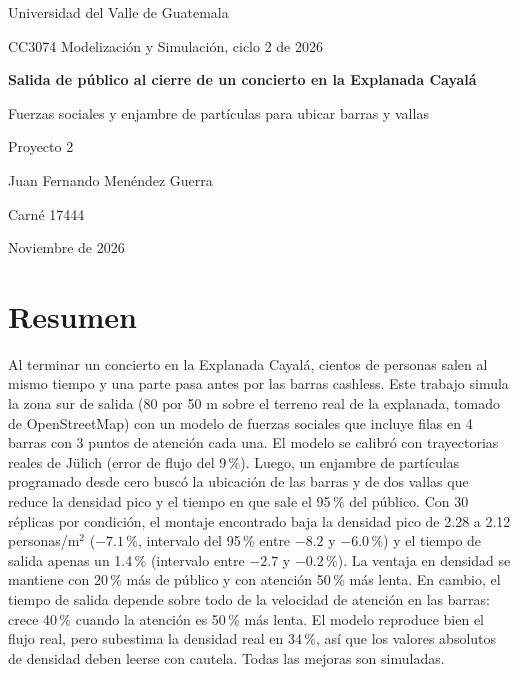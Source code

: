 \documentclass[11pt,letterpaper]{article}
\newcommand{\autor}{Juan Fernando Men\'endez Guerra}
\newcommand{\carne}{Carn\'e 17444}
\begin{document}
\begin{titlepage}
\centering
{\large Universidad del Valle de Guatemala\par}
{\large CC3074 Modelizaci\'on y Simulaci\'on, ciclo 2 de 2026\par}
\vspace{3cm}
{\LARGE\bfseries Salida de p\'ublico al cierre de un concierto en la Explanada Cayal\'a\par}
\vspace{0.5cm}
{\large Fuerzas sociales y enjambre de part\'iculas para ubicar barras y vallas\par}
\vspace{3cm}
{\large Proyecto 2\par}
\vspace{1cm}
{\large \autor\par \carne\par}
\vfill
{\large Noviembre de 2026\par}
\end{titlepage}

\section*{Resumen}
Al terminar un concierto en la Explanada Cayalá, cientos de personas salen al mismo tiempo y una parte pasa antes por las barras cashless. Este trabajo simula la zona sur de salida (80 por 50 m sobre el terreno real de la explanada, tomado de OpenStreetMap) con un modelo de fuerzas sociales que incluye filas en 4 barras con 3 puntos de atención cada una. El modelo se calibró con trayectorias reales de Jülich (error de flujo del 9\,\%). Luego, un enjambre de partículas programado desde cero buscó la ubicación de las barras y de dos vallas que reduce la densidad pico y el tiempo en que sale el 95\,\% del público. Con 30 réplicas por condición, el montaje encontrado baja la densidad pico de 2.28 a 2.12 personas/m$^2$ ($-7.1$\,\%, intervalo del 95\,\% entre $-8.2$ y $-6.0$\,\%) y el tiempo de salida apenas un 1.4\,\% (intervalo entre $-2.7$ y $-0.2$\,\%). La ventaja en densidad se mantiene con 20\,\% más de público y con atención 50\,\% más lenta. En cambio, el tiempo de salida depende sobre todo de la velocidad de atención en las barras: crece 40\,\% cuando la atención es 50\,\% más lenta. El modelo reproduce bien el flujo real, pero subestima la densidad real en 34\,\%, así que los valores absolutos de densidad deben leerse con cautela. Todas las mejoras son simuladas.

\tableofcontents
\newpage
\end{document}
